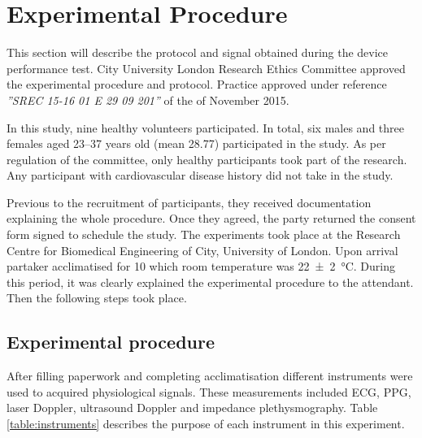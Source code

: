 
\chapter{Experimental Procedure}  %
\label{chapter procedure}

\ifpdf
    \graphicspath{{Chapter4/Figs/Raster/}{Chapter4/Figs/PDF/}{Chapter4/Figs/}}
\else
    \graphicspath{{Chapter4/Figs/Vector/}{Chapter4/Figs/}}
\fi

This section will describe the protocol and signal obtained during the device performance test. City University London Research Ethics Committee approved the experimental procedure and protocol. Practice approved under reference \textit{''SREC 15-16 01 E 29 09 201''} of the  of November 2015. 

In this study, nine healthy volunteers participated. In total, six males and three females aged \numrange{23}{37} years old (mean 28.77) participated in the study. As per regulation of the committee, only healthy participants took part of the research. Any participant with cardiovascular disease history did not take in the study. 

Previous to the recruitment of participants, they received documentation explaining the whole procedure. Once they agreed, the party returned the consent form signed to schedule the study. The experiments took place at the Research Centre for Biomedical Engineering of City, University of London. Upon arrival partaker acclimatised for \SI{10}{\min} which room temperature was \SI{22(2)}{\degreeCelsius}. During this period, it was clearly explained the experimental procedure to the attendant. Then the following steps took place.


\section{Experimental procedure} %
\label{section4.1}

After filling paperwork and completing acclimatisation different instruments were used to acquired physiological signals. These measurements included ECG, PPG, laser Doppler, ultrasound Doppler and impedance plethysmography. Table \ref{table:instruments} describes the purpose of each instrument in this experiment. 

